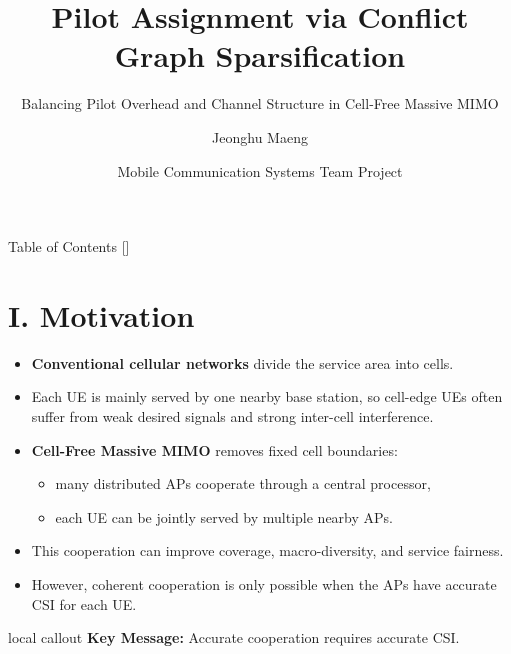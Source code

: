 \documentclass[aspectratio=169, 10pt]{beamer}
\title{Pilot Assignment via Conflict Graph Sparsification}
\subtitle{Balancing Pilot Overhead and Channel Structure in Cell-Free Massive MIMO}
\author{Jeonghu Maeng}
\institute{School of Electrical Engineering, Korea University}
\date{Mobile Communication Systems Team Project}
\newcommand{\slidecallout}[2]{%
    \vspace{0.08cm}%
    \begin{beamercolorbox}[wd=\linewidth,sep=0.55ex,leftskip=0.8ex,rightskip=0.8ex,rounded=true]{local callout}
        \small{\color{ku_crimson}\bfseries #1:} #2
    \end{beamercolorbox}%
}
\begin{document}
\begin{frame}
    \titlepage
    \vspace*{-47pt}
\end{frame}

\begin{frame}{Table of Contents}
    []
    \tableofcontents
\end{frame}

\section{I. Motivation}
\OnlyTitle
\begin{frame}{\insertsectionhead}
    \begin{itemize}
        \setlength{\itemsep}{0.85em}
        \item \textbf{Conventional cellular networks} divide the service area into cells.
        \item Each UE is mainly served by one nearby base station, so cell-edge UEs often suffer from weak desired signals and strong inter-cell interference.
        \item \textbf{Cell-Free Massive MIMO} removes fixed cell boundaries:
              \begin{itemize}
                  \item many distributed APs cooperate through a central processor,
                  \item each UE can be jointly served by multiple nearby APs.
              \end{itemize}
        \item This cooperation can improve coverage, macro-diversity, and service fairness.
        \item However, coherent cooperation is only possible when the APs have accurate CSI for each UE.
    \end{itemize}

    \vspace{0.12cm}
    \slidecallout{Key Message}{Accurate cooperation requires accurate CSI.}
\end{frame}
\end{document}
